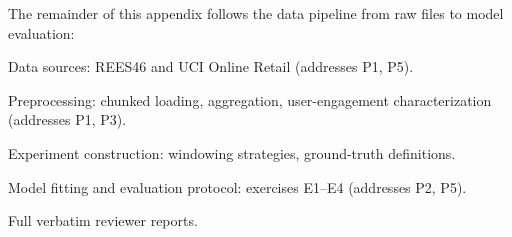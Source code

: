 The remainder of this appendix follows the data pipeline
from raw files to model evaluation:
\begin{description}[leftmargin=!,labelwidth=2.8cm]
  \item[Section~\ref{sec:data_sources}]
    Data sources: REES46 and UCI Online Retail
    (addresses P1, P5).
  \item[Section~\ref{sec:preprocessing}]
    Preprocessing: chunked loading, aggregation,
    user-engagement characterization
    (addresses P1, P3).
  \item[Section~\ref{sec:experiment_construction}]
    Experiment construction: windowing strategies,
    ground-truth definitions.
  \item[Section~\ref{sec:fitting}]
    Model fitting and evaluation protocol: exercises
    E1--E4 (addresses P2, P5).
  \item[Appendix~\ref{app:reviews}]
    Full verbatim reviewer reports.
\end{description}
